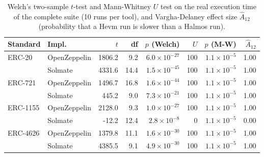 \begin{table}[htbp]
\centering
\begin{scriptsize}
\begin{tabular}{llrrrrrr}
\toprule
\textbf{Standard} & \textbf{Impl.} & $t$ & df & $p$ (Welch) & $U$ & $p$ (M-W) & $\hat{A}_{12}$ \\
\midrule
ERC-20 & OpenZeppelin & 1806.2 & 9.2 & $6.0\times10^{-27}$ & 100 & $1.1\times10^{-5}$ & 1.00 \\
 & Solmate & 4331.6 & 14.4 & $1.5\times10^{-45}$ & 100 & $1.1\times10^{-5}$ & 1.00 \\
\addlinespace
ERC-721 & OpenZeppelin & 1496.7 & 16.8 & $1.6\times10^{-44}$ & 100 & $1.1\times10^{-5}$ & 1.00 \\
 & Solmate & 445.2 & 9.0 & $7.3\times10^{-21}$ & 100 & $1.1\times10^{-5}$ & 1.00 \\
\addlinespace
ERC-1155 & OpenZeppelin & 2128.0 & 9.3 & $1.0\times10^{-27}$ & 100 & $1.1\times10^{-5}$ & 1.00 \\
 & Solmate & -12.2 & 12.4 & $2.8\times10^{-8}$ & 0 & $1.1\times10^{-5}$ & 0.00 \\
\addlinespace
ERC-4626 & OpenZeppelin & 1379.8 & 11.1 & $1.6\times10^{-30}$ & 100 & $1.1\times10^{-5}$ & 1.00 \\
 & Solmate & 4385.5 & 9.1 & $4.9\times10^{-30}$ & 100 & $1.1\times10^{-5}$ & 1.00 \\
\bottomrule
\end{tabular}
\end{scriptsize}
\caption{Welch's two-sample $t$-test and Mann-Whitney $U$ test on the real execution time of the complete suite (10 runs per tool), and Vargha-Delaney effect size $\hat{A}_{12}$ (probability that a Hevm run is slower than a Halmos run).}
\label{tab:stats}
\end{table}
